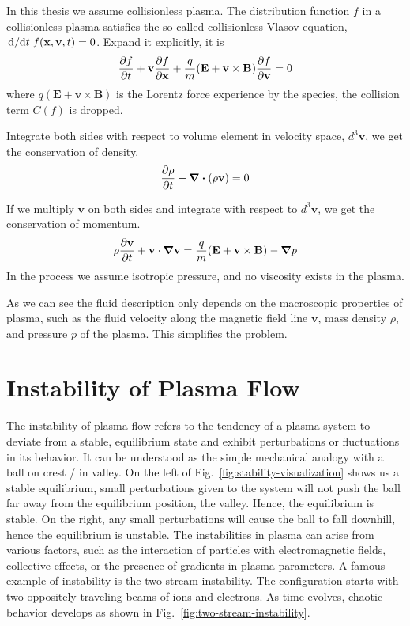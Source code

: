 In this thesis we assume collisionless plasma. The distribution function $f$ in a collisionless plasma satisfies the so-called collisionless Vlasov equation, $\dv*{t} f(\mathbf{x}, \mathbf{v}, t) = 0$. Expand it explicitly, it is
\begin{equation} \label{eq:vlasov}
	\pdv{f}{t} + \mathbf{v}\pdv{f}{\mathbf{x}} + \frac{q}{m}(\mathbf{E} + \mathbf{v}\times\mathbf{B})\pdv{f}{\mathbf{v}} = 0
\end{equation}
where $q(\mathbf{E} + \mathbf{v}\times\mathbf{B})$ is the Lorentz force experience by the species, the collision term $C(f)$ is dropped.

Integrate both sides with respect to volume element in velocity space, $d^3\mathbf{v}$, we get the conservation of density.
\[ \pdv{\rho}{t} + \div(\rho\mathbf{v}) = 0 \]

If we multiply $\mathbf{v}$ on both sides and integrate with respect to $d^3\mathbf{v}$, we get the conservation of momentum.
\[ \rho\pdv{\mathbf{v}}{t} + \mathbf{v}\cdot\grad{\mathbf{v}} = \frac{q}{m}(\mathbf{E+v\times B}) - \grad{p} \]
In the process we assume isotropic pressure, and no viscosity exists in the plasma.

As we can see the fluid description only depends on the macroscopic properties of plasma, such as the fluid velocity along the magnetic field line $\mathbf{v}$, mass density $\rho$, and pressure $p$ of the plasma. This simplifies the problem.

\section{Instability of Plasma Flow}
The instability of plasma flow refers to the tendency of a plasma system to deviate from a stable, equilibrium state and exhibit perturbations or fluctuations in its behavior. It can be understood as the simple mechanical analogy with a ball on crest / in valley. On the left of Fig.~\ref{fig:stability-visualization} shows us a stable equilibrium, small perturbations given to the system will not push the ball far away from the equilibrium position, the valley. Hence, the equilibrium is stable. On the right, any small perturbations will cause the ball to fall downhill, hence the equilibrium is unstable. The instabilities in plasma can arise from various factors, such as the interaction of particles with electromagnetic fields, collective effects, or the presence of gradients in plasma parameters. A famous example of instability is the two stream instability. The configuration starts with two oppositely traveling beams of ions and electrons. As time evolves, chaotic behavior develops as shown in Fig.~\ref{fig:two-stream-instability}.

